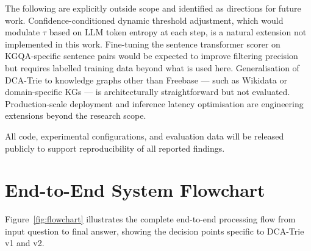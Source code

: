 The following are explicitly outside scope and identified as directions for future work. Confidence-conditioned dynamic threshold adjustment, which would modulate $\tau$ based on LLM token entropy at each step, is a natural extension not implemented in this work. Fine-tuning the sentence transformer scorer on KGQA-specific sentence pairs would be expected to improve filtering precision but requires labelled training data beyond what is used here. Generalisation of DCA-Trie to knowledge graphs other than Freebase --- such as Wikidata or domain-specific KGs --- is architecturally straightforward but not evaluated. Production-scale deployment and inference latency optimisation are engineering extensions beyond the research scope.

All code, experimental configurations, and evaluation data will be released publicly to support reproducibility of all reported findings.

\section{End-to-End System Flowchart}
\label{sec:flowchart}

Figure~\ref{fig:flowchart} illustrates the complete end-to-end processing flow from input question to final answer, showing the decision points specific to DCA-Trie v1 and v2.

